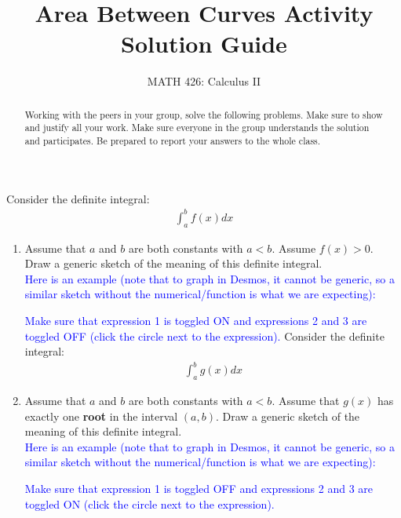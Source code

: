 \documentclass{ximera}
\title{Area Between Curves Activity Solution Guide}
\author{MATH 426: Calculus II}
\begin{document}
\begin{abstract}
   Working with the peers in your group, solve the following problems. Make sure to show and justify all your work. Make sure everyone in the group understands the solution and participates. Be prepared to report your answers to the whole class. 
\end{abstract}
\maketitle

 \begin{exercise}
 Consider the definite integral:
 \begin{align}
     	\int_{a}^b f(x) dx \nonumber
 \end{align}
     \begin{enumerate}
         \item Assume that $a$ and $b$ are both constants with $a < b$. Assume $f(x)>0$. Draw a generic sketch of the meaning of this definite integral. \\
         \textcolor{blue}{Here is an example (note that to graph in Desmos, it cannot be generic, so a similar sketch without the numerical/function is what we are expecting):}
         \begin{center}
         \end{center}
         \textcolor{blue}{Make sure that expression 1 is toggled ON and expressions 2 and 3 are toggled OFF (click the circle next to the expression).}
          Consider the definite integral:
 \begin{align}
 	\int_{a}^b g(x) dx \nonumber
 \end{align}
         \item Assume that $a$ and $b$ are both constants with $a < b$. Assume that $g(x)$ has exactly one {\bf{root}} in the interval $(a,b)$. Draw a generic sketch of the meaning of this definite integral.\\
         \textcolor{blue}{Here is an example (note that to graph in Desmos, it cannot be generic, so a similar sketch without the numerical/function is what we are expecting):}
         \begin{center}
         \end{center}
         \textcolor{blue}{Make sure that expression 1 is toggled OFF and expressions 2 and 3 are toggled ON (click the circle next to the expression).}


\end{enumerate}
\end{exercise}
\end{document}
